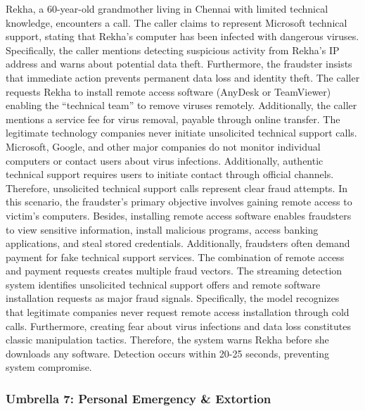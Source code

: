 \documentclass{article}
\begin{document}
Rekha, a 60-year-old grandmother living in Chennai with limited technical knowledge, encounters a call. The caller claims to represent Microsoft technical support, stating that Rekha's computer has been infected with dangerous viruses. Specifically, the caller mentions detecting suspicious activity from Rekha's IP address and warns about potential data theft. Furthermore, the fraudster insists that immediate action prevents permanent data loss and identity theft. The caller requests Rekha to install remote access software (AnyDesk or TeamViewer) enabling the ``technical team'' to remove viruses remotely. Additionally, the caller mentions a service fee for virus removal, payable through online transfer. The legitimate technology companies never initiate unsolicited technical support calls. Microsoft, Google, and other major companies do not monitor individual computers or contact users about virus infections. Additionally, authentic technical support requires users to initiate contact through official channels. Therefore, unsolicited technical support calls represent clear fraud attempts. In this scenario, the fraudster's primary objective involves gaining remote access to victim's computers. Besides, installing remote access software enables fraudsters to view sensitive information, install malicious programs, access banking applications, and steal stored credentials. Additionally, fraudsters often demand payment for fake technical support services. The combination of remote access and payment requests creates multiple fraud vectors. The streaming detection system identifies unsolicited technical support offers and remote software installation requests as major fraud signals. Specifically, the model recognizes that legitimate companies never request remote access installation through cold calls. Furthermore, creating fear about virus infections and data loss constitutes classic manipulation tactics. Therefore, the system warns Rekha before she downloads any software. Detection occurs within 20-25 seconds, preventing system compromise.

\subsubsection{Umbrella 7: Personal Emergency \& Extortion}
\label{app:casestudy:emergency}
\end{document}
